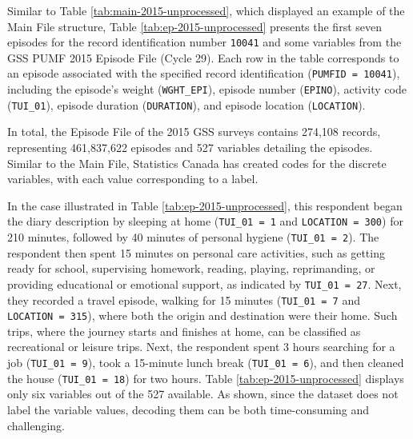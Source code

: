 \documentclass[Royal,times,sageh]{sagej}
\begin{document}
Similar to Table \ref{tab:main-2015-unprocessed}, which displayed an
example of the Main File structure, Table \ref{tab:ep-2015-unprocessed}
presents the first seven episodes for the record identification number
\texttt{10041} and some variables from the GSS PUMF 2015 Episode File
(Cycle 29). Each row in the table corresponds to an episode associated
with the specified record identification (\texttt{PUMFID\ =\ 10041}),
including the episode's weight (\texttt{WGHT\_EPI}), episode number
(\texttt{EPINO}), activity code (\texttt{TUI\_01}), episode duration
(\texttt{DURATION}), and episode location (\texttt{LOCATION}).

In total, the Episode File of the 2015 GSS surveys contains 274,108
records, representing 461,837,622 episodes and 527 variables detailing
the episodes. Similar to the Main File, Statistics Canada has created
codes for the discrete variables, with each value corresponding to a
label.

In the case illustrated in Table \ref{tab:ep-2015-unprocessed}, this
respondent began the diary description by sleeping at home
(\texttt{TUI\_01\ =\ 1} and \texttt{LOCATION\ =\ 300}) for 210 minutes,
followed by 40 minutes of personal hygiene (\texttt{TUI\_01\ =\ 2}). The
respondent then spent 15 minutes on personal care activities, such as
getting ready for school, supervising homework, reading, playing,
reprimanding, or providing educational or emotional support, as
indicated by \texttt{TUI\_01\ =\ 27}. Next, they recorded a travel
episode, walking for 15 minutes (\texttt{TUI\_01\ =\ 7} and
\texttt{LOCATION\ =\ 315}), where both the origin and destination were
their home. Such trips, where the journey starts and finishes at home,
can be classified as recreational or leisure trips. Next, the respondent
spent 3 hours searching for a job (\texttt{TUI\_01\ =\ 9}), took a
15-minute lunch break (\texttt{TUI\_01\ =\ 6}), and then cleaned the
house (\texttt{TUI\_01\ =\ 18}) for two hours. Table
\ref{tab:ep-2015-unprocessed} displays only six variables out of the 527
available. As shown, since the dataset does not label the variable
values, decoding them can be both time-consuming and challenging.

\begingroup\fontsize{8}{10}\selectfont
\end{document}
